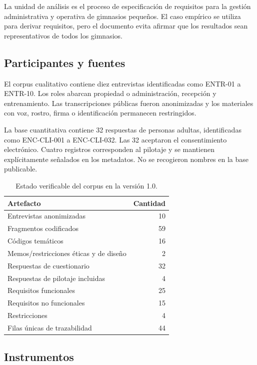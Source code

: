 \documentclass[11pt,a4paper]{article}
\begin{document}
La unidad de análisis es el proceso de especificación de requisitos para la gestión administrativa y operativa de gimnasios pequeños. El caso empírico se utiliza para derivar requisitos, pero el documento evita afirmar que los resultados sean representativos de todos los gimnasios.

\subsection{Participantes y fuentes}

El corpus cualitativo contiene diez entrevistas identificadas como ENTR-01 a ENTR-10. Los roles abarcan propiedad o administración, recepción y entrenamiento. Las transcripciones públicas fueron anonimizadas y los materiales con voz, rostro, firma o identificación permanecen restringidos.

La base cuantitativa contiene 32 respuestas de personas adultas, identificadas como ENC-CLI-001 a ENC-CLI-032. Las 32 aceptaron el consentimiento electrónico. Cuatro registros corresponden al pilotaje y se mantienen explícitamente señalados en los metadatos. No se recogieron nombres en la base publicable.

\begin{table}[H]
\centering
\caption{Estado verificable del corpus en la versión 1.0.}
\begin{tabular}{lr}
\toprule
Artefacto & Cantidad\\
\midrule
Entrevistas anonimizadas & 10\\
Fragmentos codificados & 59\\
Códigos temáticos & 16\\
Memos/restricciones éticas y de diseño & 2\\
Respuestas de cuestionario & 32\\
Respuestas de pilotaje incluidas & 4\\
Requisitos funcionales & 25\\
Requisitos no funcionales & 15\\
Restricciones & 4\\
Filas únicas de trazabilidad & 44\\
\bottomrule
\end{tabular}
\end{table}

\subsection{Instrumentos}
\end{document}
